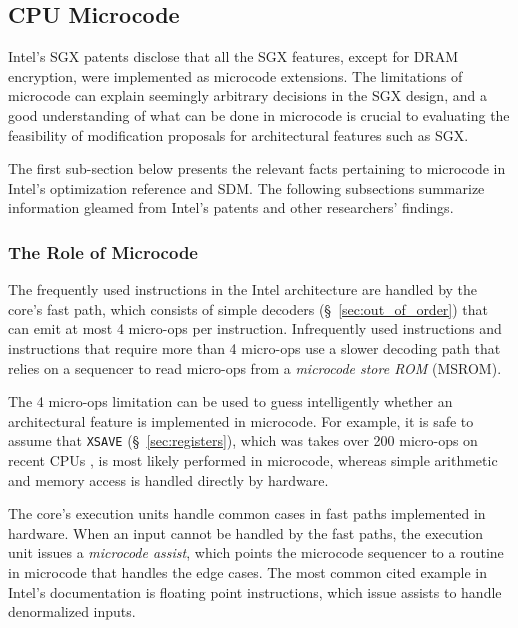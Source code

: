 \subsection{CPU Microcode}
\label{sec:microcode}

Intel's SGX patents disclose that all the SGX features, except for DRAM
encryption, were implemented as microcode extensions. The limitations of
microcode can explain seemingly arbitrary decisions in the SGX design, and a
good understanding of what can be done in microcode is crucial to evaluating
the feasibility of modification proposals for architectural features such as
SGX.

The first sub-section below presents the relevant facts pertaining to microcode
in Intel's optimization reference \cite{intel2014optimization} and SDM. The
following subsections summarize information gleamed from Intel's patents and
other researchers' findings.


\subsubsection{The Role of Microcode}
\label{sec:microcode_role}


The frequently used instructions in the Intel architecture are handled by the
core's fast path, which consists of simple decoders (\S~\ref{sec:out_of_order})
that can emit at most 4 micro-ops per instruction. Infrequently used
instructions and instructions that require more than 4 micro-ops use a slower
decoding path that relies on a sequencer to read micro-ops from a
\textit{microcode store ROM} (MSROM).

The 4 micro-ops limitation can be used to guess intelligently whether an
architectural feature is implemented in microcode. For example, it is safe to
assume that \texttt{XSAVE} (\S~\ref{sec:registers}), which was takes over 200
micro-ops on recent CPUs \cite{fog2014microops}, is most likely performed in
microcode, whereas simple arithmetic and memory access is handled directly by
hardware.


The core's execution units handle common cases in fast paths implemented in
hardware. When an input cannot be handled by the fast paths, the execution
unit issues a \textit{microcode assist}, which points the microcode sequencer
to a routine in microcode that handles the edge cases. The most common cited
example in Intel's documentation is floating point instructions, which issue
assists to handle denormalized inputs.

